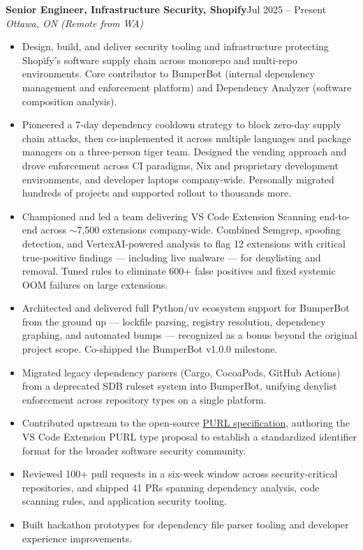 \documentclass[11pt,letterpaper]{article}
\newcommand{\role}[4]{%
  \vspace{0.4em}%
  \noindent\textbf{#1, #2}\hfill{#4}\\
  \textit{#3}\par\vspace{0.05em}%
}
\begin{document}
\role{Senior Engineer, Infrastructure Security}{Shopify}{Ottawa, ON (Remote from WA)}{Jul 2025 -- Present}
\begin{itemize}
  \item Design, build, and deliver security tooling and infrastructure protecting Shopify's software supply chain across monorepo and multi-repo environments. Core contributor to BumperBot (internal dependency management and enforcement platform) and Dependency Analyzer (software composition analysis).
  \item Pioneered a 7-day dependency cooldown strategy to block zero-day supply chain attacks, then co-implemented it across multiple languages and package managers on a three-person tiger team. Designed the vending approach and drove enforcement across CI paradigms, Nix and proprietary development environments, and developer laptops company-wide. Personally migrated hundreds of projects and supported rollout to thousands more.
  \item Championed and led a team delivering VS Code Extension Scanning end-to-end across $\sim$7,500 extensions company-wide. Combined Semgrep, spoofing detection, and VertexAI-powered analysis to flag 12 extensions with critical true-positive findings --- including live malware --- for denylisting and removal. Tuned rules to eliminate 600+ false positives and fixed systemic OOM failures on large extensions.
  \item Architected and delivered full Python/uv ecosystem support for BumperBot from the ground up --- lockfile parsing, registry resolution, dependency graphing, and automated bumps --- recognized as a bonus beyond the original project scope. Co-shipped the BumperBot v1.0.0 milestone.
  \item Migrated legacy dependency parsers (Cargo, CocoaPods, GitHub Actions) from a deprecated SDB ruleset system into BumperBot, unifying denylist enforcement across repository types on a single platform.
  \item Contributed upstream to the open-source \href{https://github.com/package-url/purl-spec/pull/673}{PURL specification}, authoring the VS Code Extension PURL type proposal to establish a standardized identifier format for the broader software security community.
  \item Reviewed 100+ pull requests in a six-week window across security-critical repositories, and shipped 41 PRs spanning dependency analysis, code scanning rules, and application security tooling.
  \item Built hackathon prototypes for dependency file parser tooling and developer experience improvements.
\end{itemize}
\end{document}
